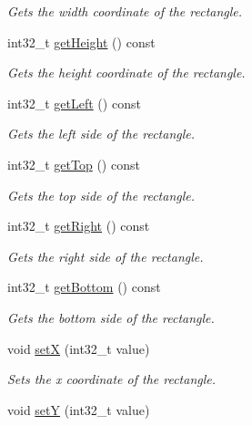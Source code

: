 \begin{DoxyCompactItemize}
\begin{DoxyCompactList}\small\item\em Gets the width coordinate of the rectangle. \end{DoxyCompactList}\item 
int32\+\_\+t \mbox{\hyperlink{structmath_1_1_rectangle_aa72d1b0179df2d39648e0ed78180706a}{get\+Height}} () const
\begin{DoxyCompactList}\small\item\em Gets the height coordinate of the rectangle. \end{DoxyCompactList}\item 
int32\+\_\+t \mbox{\hyperlink{structmath_1_1_rectangle_a6bb859d2cbe0f997d9ff45e52cdf5078}{get\+Left}} () const
\begin{DoxyCompactList}\small\item\em Gets the left side of the rectangle. \end{DoxyCompactList}\item 
int32\+\_\+t \mbox{\hyperlink{structmath_1_1_rectangle_a56871e3f25ebccdf659f6cedb80f7e5d}{get\+Top}} () const
\begin{DoxyCompactList}\small\item\em Gets the top side of the rectangle. \end{DoxyCompactList}\item 
int32\+\_\+t \mbox{\hyperlink{structmath_1_1_rectangle_a510cbe314842f09d09310548a93ca9ed}{get\+Right}} () const
\begin{DoxyCompactList}\small\item\em Gets the right side of the rectangle. \end{DoxyCompactList}\item 
int32\+\_\+t \mbox{\hyperlink{structmath_1_1_rectangle_ac9b27874d1c617d6fd6a573ece887847}{get\+Bottom}} () const
\begin{DoxyCompactList}\small\item\em Gets the bottom side of the rectangle. \end{DoxyCompactList}\item 
void \mbox{\hyperlink{structmath_1_1_rectangle_a01a51ea1a9eabb9cea31893745fcec26}{setX}} (int32\+\_\+t value)
\begin{DoxyCompactList}\small\item\em Sets the x coordinate of the rectangle. \end{DoxyCompactList}\item 
void \mbox{\hyperlink{structmath_1_1_rectangle_a7d449568e902248b51a45c136cab1e60}{setY}} (int32\+\_\+t value)

\end{DoxyCompactItemize}
